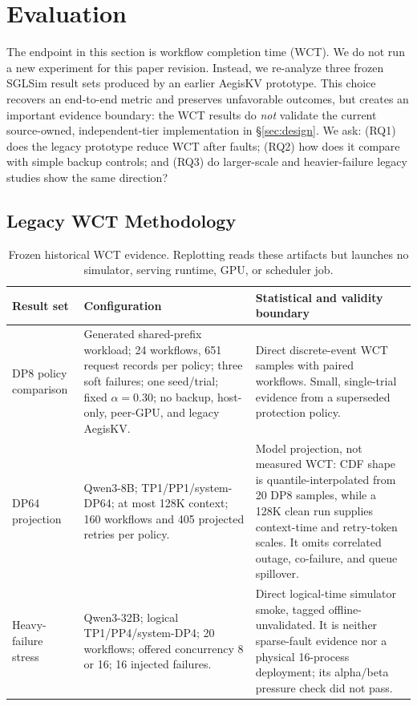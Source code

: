 \section{Evaluation}
\label{sec:evaluation}

The endpoint in this section is workflow completion time (WCT).  We do not
run a new experiment for this paper revision.  Instead, we re-analyze three
frozen SGLSim result sets produced by an earlier AegisKV prototype.  This
choice recovers an end-to-end metric and preserves unfavorable outcomes, but
creates an important evidence boundary: the WCT results do \emph{not} validate
the current source-owned, independent-tier implementation in
\S\ref{sec:design}.  We ask: (RQ1) does the legacy prototype reduce WCT after
faults; (RQ2) how does it compare with simple backup controls; and (RQ3) do
larger-scale and heavier-failure legacy studies show the same direction?

\subsection{Legacy WCT Methodology}

\begin{table}[t]
  \centering
  \caption{Frozen historical WCT evidence.  Replotting reads these artifacts
  but launches no simulator, serving runtime, GPU, or scheduler job.}
  \label{tab:legacy-wct-setup}
  \begin{tabular}{@{}p{}p{}p{}@{}}
    \toprule
    Result set & Configuration & Statistical and validity boundary \\
    \midrule
    DP8 policy comparison & Generated shared-prefix workload; 24 workflows,
      651 request records per policy; three soft failures; one seed/trial;
      fixed $\alpha=0.30$; no backup, host-only, peer-GPU, and legacy AegisKV. &
      Direct discrete-event WCT samples with paired workflows.  Small,
      single-trial evidence from a superseded protection policy. \\
    DP64 projection & Qwen3-8B; TP1/PP1/system-DP64; at most 128K context;
      160 workflows and 405 projected retries per policy. & Model projection,
      not measured WCT: CDF shape is quantile-interpolated from 20 DP8
      samples, while a 128K clean run supplies context-time and retry-token
      scales.  It omits correlated outage, co-failure, and queue spillover. \\
    Heavy-failure stress & Qwen3-32B; logical TP1/PP4/system-DP4; 20 workflows;
      offered concurrency 8 or 16; 16 injected failures. & Direct logical-time
      simulator smoke, tagged offline-unvalidated.  It is neither sparse-fault
      evidence nor a physical 16-process deployment; its alpha/beta pressure
      check did not pass. \\
    \bottomrule
  \end{tabular}
\end{table}

